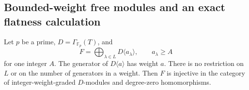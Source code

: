 \subsection{Bounded-weight free modules and an exact flatness calculation}

\begin{proposition}
\label{AL14}
Let $p$ be a prime, $D=\Gamma_{\mathbb F_p}(T)$, and
\[
 F=\bigoplus_{\lambda\in L}D\langle a_\lambda\rangle,
 \qquad a_\lambda\geq A
 \tag{AL.78}
\]
for one integer $A$. The generator of $D\langle a\rangle$
has weight $a$. There is no restriction on $L$ or on the
number of generators in a weight. Then $F$ is injective
in the category of integer-weight-graded $D$-modules
and degree-zero homomorphisms.
\end{proposition}

